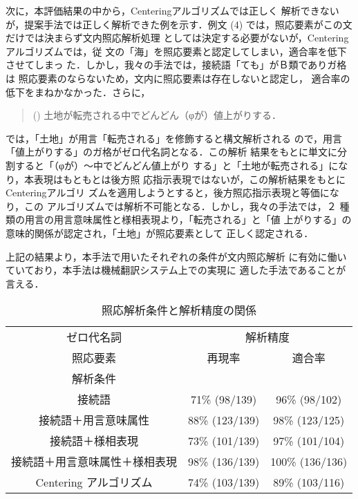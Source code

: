 次に，本評価結果の中から，Centeringアルゴリズムでは正しく
解析できないが，提案手法では正しく解析できた例を示す．例文
(4) では，照応要素がこの文だけでは決まらず文内照応解析処理
としては決定する必要がないが，Centeringアルゴリズムでは，従
文の「海」を照応要素と認定してしまい，適合率を低下させてしまっ
た．しかし，我々の手法では，接続語「ても」がＢ類でありガ格は
照応要素のならないため，文内に照応要素は存在しないと認定し，
適合率の低下をまねかなかった．さらに，

\begin{quote}
() 土地が転売される中でどんどん（φが）値上がりする．
\end{quote}

\noindent
では，「土地」が用言「転売される」を修飾すると構文解析される
ので，用言「値上がりする」のガ格がゼロ代名詞となる．この解析
結果をもとに単文に分割すると「（φが）〜中でどんどん値上がり
する」と「土地が転売される」になり，本表現はもともとは後方照
応指示表現ではないが，この解析結果をもとにCenteringアルゴリ
ズムを適用しようとすると，後方照応指示表現と等価になり，この
アルゴリズムでは解析不可能となる．しかし，我々の手法では，２
種類の用言の用言意味属性と様相表現より，「転売される」と「値
上がりする」の意味的関係が認定され，「土地」が照応要素として
正しく認定される．

上記の結果より，本手法で用いたそれぞれの条件が文内照応解析
に有効に働いていており，本手法は機械翻訳システム上での実現に
適した手法であることが言える．

\begin{table}[htbp]
  \begin{center}
    \caption{照応解析条件と解析精度の関係}
    \vspace{2mm}
    \leavevmode
    \footnotesize
    \begin{tabular}{||c|c|c||} \hline \hline
    ゼロ代名詞 & \multicolumn{2}{c||}{解析精度} \\ \cline{2-3}
    照応要素   & 再現率 & 適合率 \\ 
    解析条件   & & \\ \hline \hline
    接続語     & 71\% (98/139) & 96\% (98/102) \\ \hline
    接続語＋用言意味属性 & 88\% (123/139) & 98\% (123/125) \\ \hline
    接続語＋様相表現     & 73\% (101/139) & 97\% (101/104) \\ \hline
    接続語＋用言意味属性＋様相表現 & 98\% (136/139) & 100\% (136/136) \\ \hline \hline
    Centering アルゴリズム & 74\% (103/139) & 89\% (103/116) \\ \hline \hline
    \end{tabular} \\ 
  \end{center}
  \label{tab:eval-cond}
\end{table}

